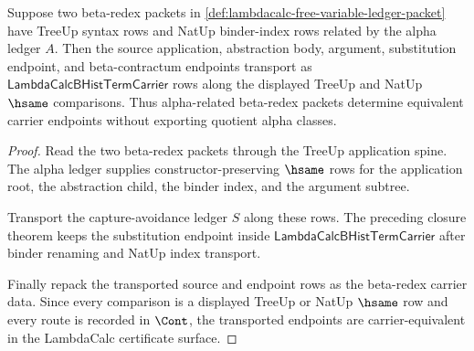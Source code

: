 \begin{theorem}
\label{thm:lambdacalc-alpha-beta-carrier-transport}
Suppose two beta-redex packets in
\autoref{def:lambdacalc-free-variable-ledger-packet} have TreeUp syntax rows
and NatUp binder-index rows related by the alpha ledger $A$. Then the source
application, abstraction body, argument, substitution endpoint, and
beta-contractum endpoints transport as
$\mathsf{LambdaCalcBHistTermCarrier}$ rows along the displayed TreeUp and NatUp
$\hsame$ comparisons. Thus alpha-related beta-redex packets determine
equivalent carrier endpoints without exporting quotient alpha classes.
\end{theorem}
\begin{proof}
Read the two beta-redex packets through the TreeUp application spine. The alpha
ledger supplies constructor-preserving $\hsame$ rows for the application root,
the abstraction child, the binder index, and the argument subtree.

Transport the capture-avoidance ledger $S$ along these rows. The preceding
closure theorem keeps the substitution endpoint inside
$\mathsf{LambdaCalcBHistTermCarrier}$ after binder renaming and NatUp index
transport.

Finally repack the transported source and endpoint rows as the beta-redex
carrier data. Since every comparison is a displayed TreeUp or NatUp $\hsame$
row and every route is recorded in $\Cont$, the transported endpoints are
carrier-equivalent in the LambdaCalc certificate surface.
\end{proof}

